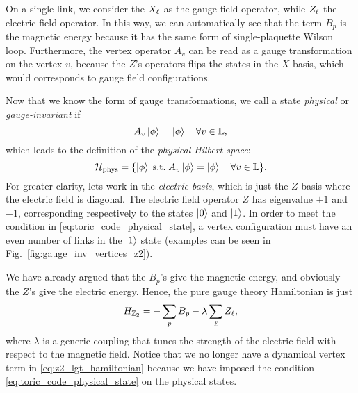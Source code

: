 On a single link, we consider the $X_{\ell}$ as the gauge field operator, while $Z_{\ell}$ the electric field operator.
In this way, we can automatically see that the term $B_p$ is the magnetic energy because it has the same form of single-plaquette Wilson loop.
Furthermore, the vertex operator $A_v$ can be read as a gauge transformation on the vertex $v$, because the $Z$'s operators flips the states in the $X$-basis, which would corresponds to gauge field configurations.

Now that we know the form of gauge transformations, we call a state \emph{physical} or \emph{gauge-invariant} if
\begin{equation}
    A_v \ket{\phi} = \ket{\phi} \quad \forall v \in \mathbb{L},
    \label{eq:toric_code_physical_state}
\end{equation}
which leads to the definition of the \emph{physical Hilbert space}:
\begin{equation}
    \mathcal{H}_{\text{phys}} = \{\ket{\phi} \; \text{s.t.} \; A_v \ket{\phi} = \ket{\phi} \quad \forall v \in \mathbb{L}\}.
    \label{eq:phys_Hilbert_space_toric}
\end{equation}
For greater clarity, lets work in the \emph{electric basis}, which is just the $Z$-basis where the electric field is diagonal.
The electric field operator $Z$ has eigenvalue $+1$ and $-1$, corresponding respectively to the states $\ket{0}$ and $\ket{1}$.
In order to meet the condition in \eqref{eq:toric_code_physical_state}, a vertex configuration must have an even number of links in the $\ket{1}$ state (examples can be seen in Fig.~\ref{fig:gauge_inv_vertices_z2}).

\begin{figure}[t]
\end{figure}

We have already argued that the $B_p$'s give the magnetic energy, and obviously the $Z$'s give the electric energy.
Hence, the pure gauge theory Hamiltonian is just
\begin{equation}
    H_{\mathbb{Z}_2} = - \sum_{p} B_p - \lambda \sum_{\ell} Z_{\ell},
    \label{eq:z2_lgt_hamiltonian}
\end{equation}
where $\lambda$ is a generic coupling that tunes the strength of the electric field with respect to the magnetic field.
Notice that we no longer have a dynamical vertex term in \eqref{eq:z2_lgt_hamiltonian} because we have imposed the condition \eqref{eq:toric_code_physical_state} on the physical states.

